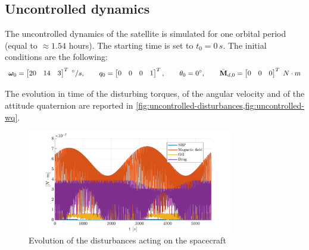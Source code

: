 \subsection{Uncontrolled dynamics}

The uncontrolled dynamics of the satellite is simulated for one orbital period (equal to $\approx 1.54$ hours). The starting time is set to $t_0 = 0 \,s$. The initial conditions are the following:
\begin{equation*}
    \bm{\omega}_0 = \begin{bmatrix}
    20 & 14 & 3
    \end{bmatrix}^T \;
    ^{\circ}/s, \qquad
    q_0 = \begin{bmatrix}
    0 & 0 & 0 & 1
    \end{bmatrix}^T, \qquad
    \theta_0 = 0^{\circ}, \qquad
    \Bar{\mathbf{M}}_{d,0} = \begin{bmatrix}
    0 & 0 & 0
    \end{bmatrix}^T \; N \cdot m
\end{equation*}

The evolution in time of the disturbing torques, of the angular velocity and of the attitude quaternion are reported in \cref{fig:uncontrolled-disturbances,fig:uncontrolled-wq}.

\begin{figure}[h!]
    \centering
    \includegraphics[width=0.8\textwidth]{graphics/uncontrolled/uncontrolled-disturbances.pdf}
    \caption{Evolution of the disturbances acting on the spacecraft}
    \label{fig:uncontrolled-disturbances}
\end{figure}

